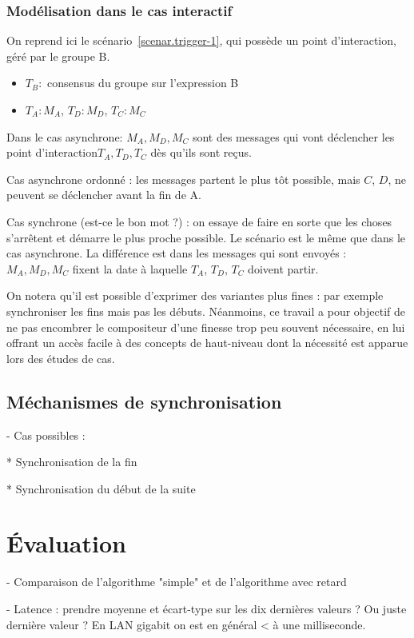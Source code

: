 \documentclass{article}
\newcommand\trigger{point d'interaction\xspace}
\begin{document}
\subsubsection{Modélisation dans le cas interactif}
On reprend ici le scénario~\ref{scenar.trigger-1}, qui possède un \trigger, géré par le groupe B.
 
\begin{itemize}
	\item $T_B: $ consensus du groupe sur l'expression B
	\item $T_A: M_A$, $T_D: M_D$, $T_C: M_C$
\end{itemize}

Dans le cas asynchrone: $M_A, M_D, M_C$ sont des messages qui vont déclencher les \trigger $T_A, T_D, T_C$ dès qu'ils sont reçus.

Cas asynchrone ordonné : les messages partent le plus tôt possible, mais $C$, $D$, ne peuvent se déclencher avant la fin de A.

Cas synchrone (est-ce le bon mot ?) : on essaye de faire en sorte que les choses s'arrêtent et démarre le plus proche possible.
Le scénario est le même que dans le cas asynchrone. La différence est dans les messages qui sont envoyés : $M_A, M_D, M_C$ fixent la date à laquelle $T_A$, $T_D$, $T_C$ doivent partir.

On notera qu'il est possible d'exprimer des variantes plus fines : par exemple synchroniser les fins mais pas les débuts. 
Néanmoins, ce travail a pour objectif de ne pas encombrer le compositeur d'une finesse trop peu souvent nécessaire, en lui offrant un accès facile à des concepts de haut-niveau dont la nécessité est apparue lors des études de cas.
\subsection{Méchanismes de synchronisation}
- Cas possibles : 


* Synchronisation de la fin

* Synchronisation du début de la suite

\section{Évaluation}\label{sec.evaluation}

- Comparaison de l'algorithme "simple" et de l'algorithme avec retard


- Latence : prendre moyenne et écart-type sur les dix dernières valeurs ? Ou juste dernière valeur ?
En LAN gigabit on est en général < à une milliseconde.
\end{document}
